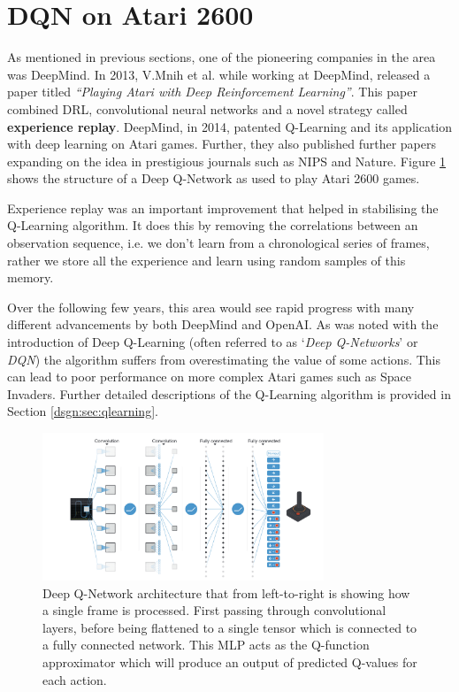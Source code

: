 \section{DQN on Atari 2600}
\label{bg:sec:dqn}
As mentioned in previous sections, one of the pioneering companies in the area was DeepMind. In 2013, V.Mnih et al. while working at DeepMind, released a paper titled \textit{``Playing Atari with Deep Reinforcement Learning''}\cite{dqn}. This paper combined DRL, convolutional neural networks and a novel strategy called \textbf{experience replay}. DeepMind, in 2014, patented Q-Learning and its application with deep learning on Atari games. Further, they also published further papers expanding on the idea in prestigious journals such as NIPS and Nature. Figure \ref{fig:q-learning-arch} shows the structure of a Deep Q-Network as used to play Atari 2600 games.

Experience replay was an important improvement that helped in stabilising the Q-Learning algorithm. It does this by removing the correlations between an observation sequence, i.e. we don't learn from a chronological series of frames, rather we store all the experience and learn using random samples of this memory.

Over the following few years, this area would see rapid progress with many different advancements by both DeepMind and OpenAI. As was noted with the introduction of Deep Q-Learning (often referred to as `\textit{Deep Q-Networks}' or \textit{DQN}) the algorithm suffers from overestimating the value of some actions. This can lead to poor performance on more complex Atari games such as Space Invaders. Further detailed descriptions of the Q-Learning algorithm is provided in Section \ref{dsgn:sec:qlearning}.

\begin{figure}[htbp]
	\centering
	\includegraphics[width=0.75\textwidth]{chapters/chapter2/images/dqn.png}
	\caption[Deep Q-Network architecture]{Deep Q-Network architecture that from left-to-right is showing how a single frame is processed. First passing through convolutional layers, before being flattened to a single tensor which is connected to a fully connected network. This MLP acts as the Q-function approximator which will produce an output of predicted Q-values for each action.
		\label{fig:q-learning-arch}
	}
\end{figure}



